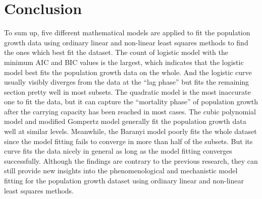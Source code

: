 \documentclass[11pt, a4paper]{article}
\begin{document}
\section{Conclusion}
To sum up, five different mathematical models are applied to fit the population growth data using ordinary linear and non-linear least squares methods to find the ones which best fit the dataset. The count of logistic model with the minimum AIC and BIC values is the largest, which indicates that the logistic model best fits the population growth data on the whole. And the logistic curve usually visibly diverges from the data at the “lag phase” but fits the remaining section pretty well in most subsets. The quadratic model is the most inaccurate one to fit the data, but it can capture the “mortality phase” of population growth after the carrying capacity has been reached in most cases. The cubic polynomial model and modified Gompertz model generally fit the population growth data well at similar levels. Meanwhile, the Baranyi model poorly fits the whole dataset since the model fitting fails to converge in more than half of the subsets. But its curve fits the data nicely in general as long as the model fitting converges successfully. Although the findings are contrary to the previous research, they can still provide new insights into the phenomenological and mechanistic model fitting for the population growth dataset using ordinary linear and non-linear least squares methods. 





\end{document}
